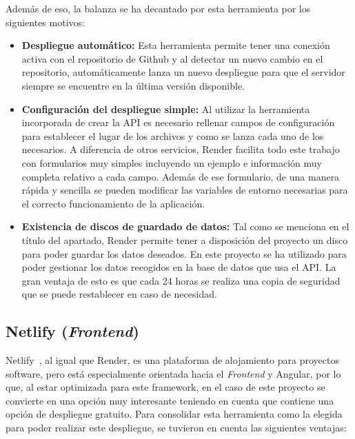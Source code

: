  Además de eso, la balanza se ha decantado por esta herramienta por los siguientes motivos:
 \begin{itemize}
     \item \textbf{Despliegue automático: }
     Esta herramienta permite tener una conexión activa con el repositorio de Github y al detectar un nuevo cambio en el repositorio, automáticamente lanza un nuevo despliegue para que el servidor siempre se encuentre en la última versión disponible.
     \item \textbf{Configuración del despliegue simple: }
     Al utilizar la herramienta incorporada de crear la API es necesario rellenar campos de configuración para establecer el lugar de los archivos y como se lanza cada uno de los necesarios. A diferencia de otros servicios, Render facilita todo este trabajo con formularios muy simples incluyendo un ejemplo e información muy completa relativo a cada campo.
     Además de ese formulario, de una manera rápida y sencilla se pueden modificar las variables de entorno necesarias para el correcto funcionamiento de la aplicación.
     \item \textbf{Existencia de discos de guardado de datos: }
     Tal como se menciona en el título del apartado, Render permite tener a disposición del proyecto un disco para poder guardar los datos deseados. En este proyecto se ha utilizado para poder gestionar los datos recogidos en la base de datos que usa el API.
     La gran ventaja de esto es que cada 24 horas se realiza una copia de seguridad que se puede restablecer en caso de necesidad.
 \end{itemize}
 
 \subsection{Netlify (\textit{Frontend})}
 Netlify~\cite{Netlify}, al igual que Render, es una plataforma de alojamiento para proyectos software, pero está especialmente orientada hacia el \textit{Frontend} y Angular, por lo que, al estar optimizada para este framework, en el caso de este proyecto se convierte en una opción muy interesante teniendo en cuenta que contiene una opción de despliegue gratuito. Para consolidar esta herramienta como la elegida para poder realizar este despliegue, se tuvieron en cuenta las siguientes ventajas:

